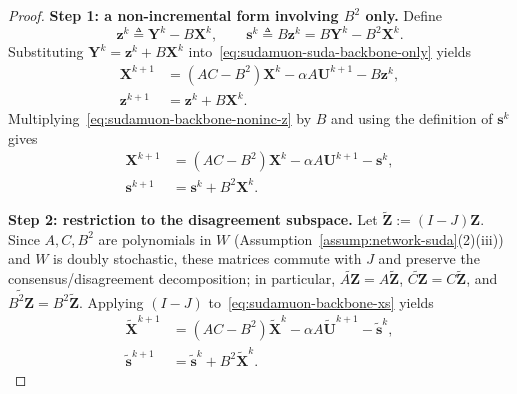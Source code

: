 \documentclass[10pt,a4paper]{amsart}
\begin{document}
\begin{proof}
\medskip\noindent\textbf{Step 1: a non-incremental form involving $B^2$ only.}
Define
\[
    \mathbf z^k \triangleq \mathbf Y^k - B\mathbf X^k,
    \qquad
    \mathbf s^k \triangleq B\mathbf z^k = B\mathbf Y^k - B^2\mathbf X^k.
\]
Substituting $\mathbf Y^k=\mathbf z^k+B\mathbf X^k$ into~\eqref{eq:sudamuon-suda-backbone-only} yields
\begin{subequations}
\label{eq:sudamuon-backbone-noninc}
\begin{align}
    \mathbf{X}^{k+1}
    &= (AC-B^2)\mathbf{X}^k - \alpha A\mathbf{U}^{k+1} - B\mathbf{z}^k,\label{eq:sudamuon-backbone-noninc-X}\\
    \mathbf{z}^{k+1}
    &= \mathbf{z}^k + B\mathbf{X}^k.\label{eq:sudamuon-backbone-noninc-z}
\end{align}
\end{subequations}
Multiplying~\eqref{eq:sudamuon-backbone-noninc-z} by $B$ and using the definition of $\mathbf s^k$ gives
\begin{subequations}
\label{eq:sudamuon-backbone-xs}
\begin{align}
\mathbf X^{k+1} &= (AC-B^2)\mathbf X^k - \alpha A\mathbf U^{k+1} - \mathbf s^k,\label{eq:sudamuon-backbone-xs-X}\\
\mathbf s^{k+1} &= \mathbf s^k + B^2\mathbf X^k.\label{eq:sudamuon-backbone-xs-s}
\end{align}
\end{subequations}

\medskip\noindent\textbf{Step 2: restriction to the disagreement subspace.}
Let $\tilde{\mathbf Z}:=(I-J)\mathbf Z$.
Since $A,C,B^2$ are polynomials in $W$ (Assumption~\ref{assump:network-suda}(2)(iii)) and $W$ is doubly stochastic,
these matrices commute with $J$ and preserve the consensus/disagreement decomposition; in particular,
$\widetilde{A\mathbf Z}=A\tilde{\mathbf Z}$, $\widetilde{C\mathbf Z}=C\tilde{\mathbf Z}$, and $\widetilde{B^2\mathbf Z}=B^2\tilde{\mathbf Z}$.
Applying $(I-J)$ to~\eqref{eq:sudamuon-backbone-xs} yields
\begin{subequations}
\label{eq:sudamuon-backbone-xs-tilde}
\begin{align}
\tilde{\mathbf X}^{k+1} &= (AC-B^2)\tilde{\mathbf X}^k - \alpha A\tilde{\mathbf U}^{k+1} - \tilde{\mathbf s}^k,\\
\tilde{\mathbf s}^{k+1} &= \tilde{\mathbf s}^k + B^2\tilde{\mathbf X}^k.
\end{align}
\end{subequations}


\end{proof}
\end{document}
